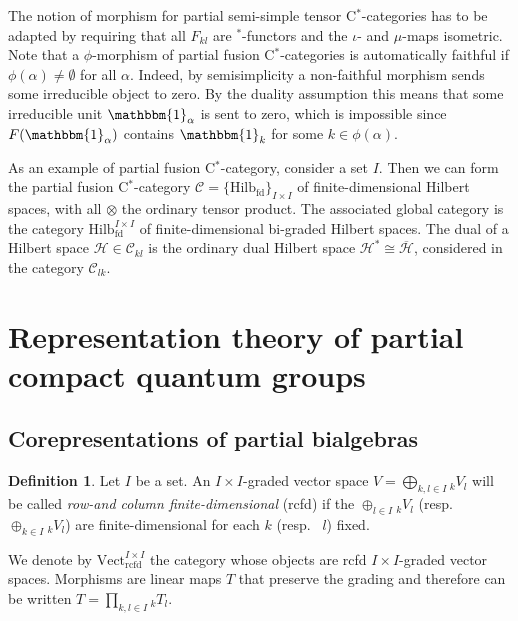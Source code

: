 \documentclass[10pt]{article}
\DeclareMathOperator{\fin}{\mathrm{fd}}
\DeclareMathOperator{\rcf}{\mathrm{rcfd}}
\newcommand{\Hsp}{\mathcal{H}}
\newcommand{\CatC}{\mathcal{C}}
\newcommand{\CatCC}{\mathscr{C}}
\newcommand{\Vectrcf}{\mathrm{Vect}^{I\times I}_{\rcf}}
\newcommand{\Hilb}{\mathrm{Hilb}}
\newcommand{\Hilbif}{\mathrm{Hilb}^{I\times I}_{\fin}}
\newcommand{\GrDA}[3]{{}_{#2}#1_{#3}} %
\theoremstyle{definition}
\newtheorem{Def}[Theorem]{Definition}
\numberwithin{equation}{section}
\begin{document}
The notion of morphism for partial semi-simple tensor C$^*$-categories has to be adapted by requiring that all $F_{kl}$ are $^*$-functors and the $\iota$- and $\mu$-maps isometric.  Note that a $\phi$-morphism of partial fusion C$^*$-categories is automatically faithful if $\phi(\alpha)\neq \emptyset$ for all $\alpha$. Indeed, by semisimplicity a non-faithful morphism sends some irreducible object to zero. By the duality assumption this means that some irreducible unit $\mathbbm{1}_{\alpha}$ is sent to zero, which is impossible since $F(\mathbbm{1}_{\alpha})$ contains $\mathbbm{1}_k$ for some $k \in \phi(\alpha)$.

As an example of partial fusion C$^*$-category, consider a set  $I$. Then we can form the partial fusion C$^*$-category $\CatCC = \{\Hilb_{\fin}\}_{I\times I}$ of finite-dimensional Hilbert spaces, with all $\otimes$ the ordinary tensor product. The associated global category is the category $\Hilbif$ of finite-dimensional bi-graded Hilbert spaces. The dual of a Hilbert space $\Hsp \in \CatC_{kl}$ is the ordinary dual Hilbert space $\Hsp^* \cong \overline{\Hsp}$, considered in the category $\CatC_{lk}$. 


\section{Representation theory of partial compact quantum groups}

\subsection{Corepresentations of partial bialgebras}




\begin{Def} Let $I$ be a set. An $I\times I$-graded vector space $V=\bigoplus_{k,l\in I} \GrDA{V}{k}{l}$ will be called \emph{row-and column finite-dimensional} (rcfd) if the $\oplus_{l\in I} \GrDA{V}{k}{l}$ (resp.~ $\oplus_{k\in I} \GrDA{V}{k}{l}$) are finite-dimensional for each $k$ (resp.~ $l$) fixed. 
\end{Def} 

We denote by  $\Vectrcf$ the category whose objects are rcfd $I\times I$-graded vector spaces. Morphisms are linear maps $T$ that preserve the grading and therefore
can be written $T=\prod_{k,l\in I} \GrDA{T}{k}{l}$. 
\end{document}
